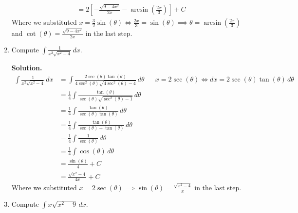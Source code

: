 \begin{Example}{}{}
\begin{enumerate}[label=(\roman*)]
\begin{align*}
                   & =2\left[ -\frac{\sqrt{9-4x^2}}{2x}-\arcsin\left( \frac{2x}{3} \right) \right]+C
              \end{align*}
              Where we substituted $ \displaystyle
                  x=\frac{3}{2}\sin(\theta)\iff \frac{2x}{3}=\sin(\theta)\implies
                  \theta=\arcsin\left( \frac{2x}{3} \right) $ and $
                  \displaystyle \cot(\theta)=
                  \frac{\sqrt{9-4x^2}}{2x} $ in the last step.
        \item Compute $ \displaystyle \int \frac{1}{x^2\sqrt{x^2-4}} \, d{x} $.

              \textbf{Solution.}
              \begin{align*}
                  \int \frac{1}{x^2\sqrt{x^2-4}} \, d{x}
                   & =\int \frac{2\sec(\theta)\tan(\theta)}{4\sec^2(\theta)\sqrt{4\sec^2(\theta)-4}} \, d{\theta} &  & x=2\sec(\theta)\iff dx=2\sec(\theta)\tan(\theta)\,d\theta \\
                   & =\frac{1}{4} \int \frac{\tan(\theta)}{\sec(\theta)\sqrt{\sec^2(\theta)-1}}\, d{\theta}                                                                      \\
                   & =\frac{1}{4} \int \frac{\tan(\theta)}{\sec(\theta)\tan(\theta)} \, d{\theta}                                                                                \\
                   & =\frac{1}{4} \int \frac{\tan(\theta)}{\sec(\theta)+\tan(\theta)} \, d{\theta}                                                                               \\
                   & =\frac{1}{4} \int \frac{1}{\sec(\theta)} \, d{\theta}                                                                                                       \\
                   & =\frac{1}{4} \int \cos(\theta)\, d{\theta}                                                                                                                  \\
                   & =\frac{\sin(\theta)}{4} +C                                                                                                                                  \\
                   & =\frac{\sqrt{x^2-4}}{4x} +C
              \end{align*}
              Where we substituted $ \displaystyle x=2\sec(\theta)\implies \sin(\theta)=\frac{\sqrt{x^2-4}}{x} $
              in the last step.
        \item Compute $ \displaystyle \int x\sqrt{x^2-9}\, d{x} $.


\end{enumerate}
\end{Example}

